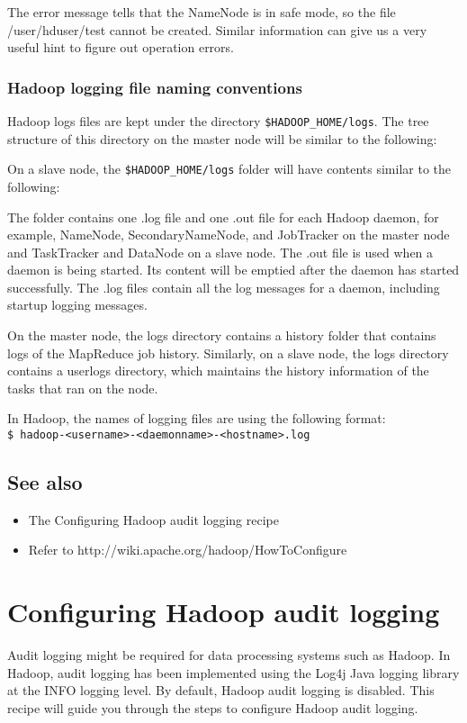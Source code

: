 The error message tells that the NameNode is in safe mode, so the file /user/hduser/test cannot be created. Similar information can give us a very useful hint to figure out operation errors.

\subsubsection*{Hadoop logging file naming conventions}
Hadoop logs files are kept under the directory \verb|$HADOOP_HOME/logs|. The tree structure of this directory on the master node will be similar to the following:


On a slave node, the \verb|$HADOOP_HOME/logs| folder will have contents similar to the following:


The folder contains one .log file and one .out file for each Hadoop daemon, for example, NameNode, SecondaryNameNode, and JobTracker on the master node and TaskTracker and DataNode on a slave node. The .out file is used when a daemon is being started. Its content will be emptied after the daemon has started successfully. The .log files contain all the log messages for a daemon, including startup logging messages.

On the master node, the logs directory contains a history folder that contains logs of the MapReduce job history. Similarly, on a slave node, the logs directory contains a userlogs directory, which maintains the history information of the tasks that ran on the node.

In Hadoop, the names of logging files are using the following format: \\
\verb|$ hadoop-<username>-<daemonname>-<hostname>.log |

\subsection*{See also}
\begin{itemize}
  \item The Configuring Hadoop audit logging recipe
  \item Refer to http://wiki.apache.org/hadoop/HowToConfigure
\end{itemize}

\section{Configuring Hadoop audit logging}
Audit logging might be required for data processing systems such as Hadoop. In Hadoop, audit logging has been implemented using the Log4j Java logging library at the INFO logging level. By default, Hadoop audit logging is disabled. This recipe will guide you through the steps to configure Hadoop audit logging.

